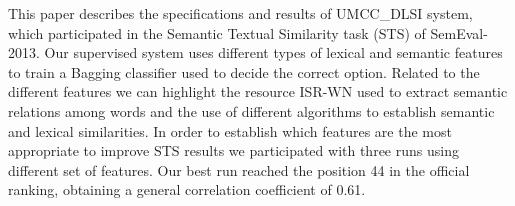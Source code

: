 This paper describes the specifications and results of UMCC\_DLSI system, which participated in the Semantic Textual Similarity task (STS) of SemEval-2013. Our
 supervised system uses different types of lexical and semantic features to
 train a Bagging classifier used to decide the correct option. Related to the
 different features we can highlight the resource ISR-WN used to extract
 semantic relations among words and the use of different algorithms to establish
 semantic and lexical similarities. In order to establish which features are the
 most appropriate to improve STS results we participated with three runs using
 different set of features. Our best run reached the position 44 in the official
 ranking, obtaining a general correlation coefficient of 0.61.

